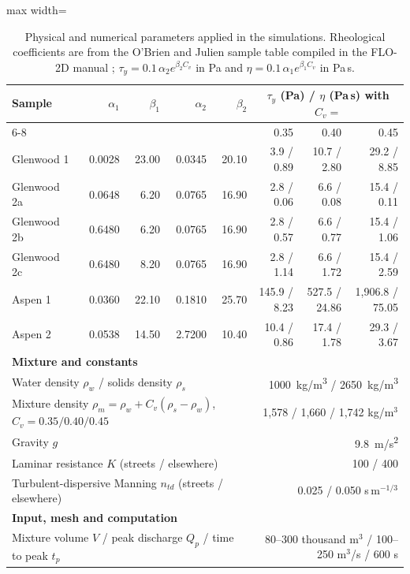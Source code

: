 \begin{table}[htbp]\centering\small
\caption{Physical and numerical parameters applied in the simulations. Rheological coefficients are from the O'Brien and Julien sample table compiled in the FLO-2D manual \citep{flo2d2021}; $\tau_y=0.1\,\alpha_2e^{\beta_2C_v}$ in Pa and $\eta=0.1\,\alpha_1e^{\beta_1C_v}$ in Pa\,s.}\label{tab:parametros}
\begin{adjustbox}{max width=\textwidth}\begin{tabular}{lrrrrrrr}\toprule
Sample & $\alpha_1$ & $\beta_1$ & $\alpha_2$ & $\beta_2$ & \multicolumn{3}{c}{$\tau_y$ (Pa) / $\eta$ (Pa\,s) with $C_v=$}\\\cmidrule(l){6-8}
 & & & & & 0.35 & 0.40 & 0.45\\\midrule
Glenwood 1 & 0.0028 & 23.00 & 0.0345 & 20.10 & 3.9 / 0.89 & 10.7 / 2.80 & 29.2 / 8.85\\
Glenwood 2a & 0.0648 & 6.20 & 0.0765 & 16.90 & 2.8 / 0.06 & 6.6 / 0.08 & 15.4 / 0.11\\
Glenwood 2b & 0.6480 & 6.20 & 0.0765 & 16.90 & 2.8 / 0.57 & 6.6 / 0.77 & 15.4 / 1.06\\
Glenwood 2c & 0.6480 & 8.20 & 0.0765 & 16.90 & 2.8 / 1.14 & 6.6 / 1.72 & 15.4 / 2.59\\
Aspen 1 & 0.0360 & 22.10 & 0.1810 & 25.70 & 145.9 / 8.23 & 527.5 / 24.86 & 1,906.8 / 75.05\\
Aspen 2 & 0.0538 & 14.50 & 2.7200 & 10.40 & 10.4 / 0.86 & 17.4 / 1.78 & 29.3 / 3.67\\
\midrule
\multicolumn{8}{l}{\textbf{Mixture and constants}}\\
\multicolumn{5}{l}{Water density $\rho_w$ / solids density $\rho_s$} & \multicolumn{3}{r}{\SI{1000}{kg/m^3} / \SI{2650}{kg/m^3}}\\
\multicolumn{5}{l}{Mixture density $\rho_m=\rho_w+C_v(\rho_s-\rho_w)$, $C_v=0.35/0.40/0.45$} & \multicolumn{3}{r}{1,578 / 1,660 / 1,742 kg/m$^3$}\\
\multicolumn{5}{l}{Gravity $g$} & \multicolumn{3}{r}{\SI{9.8}{m/s^2}}\\
\multicolumn{5}{l}{Laminar resistance $K$ (streets / elsewhere)} & \multicolumn{3}{r}{100 / 400}\\
\multicolumn{5}{l}{Turbulent-dispersive Manning $n_{td}$ (streets / elsewhere)} & \multicolumn{3}{r}{0.025 / 0.050 s\,m$^{-1/3}$}\\
\multicolumn{8}{l}{\textbf{Input, mesh and computation}}\\
\multicolumn{5}{l}{Mixture volume $V$ / peak discharge $Q_p$ / time to peak $t_p$} & \multicolumn{3}{r}{80--300 thousand m$^3$ / 100--250 m$^3$/s / 600 s}\\

\end{tabular}
\end{adjustbox}
\end{table}
